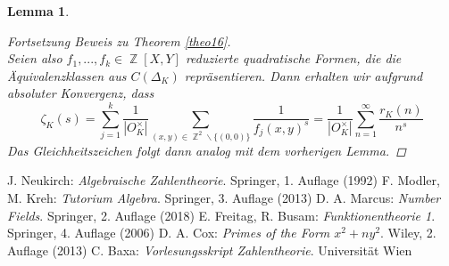 \documentclass[10pt,a4paper]{article}
\theoremstyle{plain}
\newtheorem{lem}[thm]{Lemma}
\theoremstyle{definition}
\theoremstyle{remark}
\DeclareMathOperator{\Z}{\mathbb{Z}}
\begin{document}
\begin{lem}
\begin{proof}[Fortsetzung Beweis zu Theorem \ref{theo16}]
\\
Seien also $f_1,...,f_k \in \Z[X,Y]$ reduzierte quadratische Formen, die die Äquivalenzklassen aus $C(\Delta_K)$ repräsentieren. Dann erhalten wir aufgrund absoluter Konvergenz, dass $$\zeta_K(s) = \sum_{j=1}^{k}\frac{1}{|O_K^{\times}|}\sum_{(x,y) \in \Z^2 \backslash \{(0,0)\}}\frac{1}{f_j(x,y)^s}=\frac{1}{|O_K^{\times}|}\sum_{n=1}^{\infty}\frac{r_K(n)}{n^s}$$
Das Gleichheitszeichen folgt dann analog mit dem vorherigen Lemma.
\end{proof}
\end{lem}
 
\begin{thebibliography}{99}
 J. Neukirch: \textit{Algebraische Zahlentheorie}. Springer, 1. Auflage (1992)
 F. Modler, M. Kreh: \textit{Tutorium Algebra}. Springer, 3. Auflage (2013)
 D. A. Marcus: \textit{Number Fields}. Springer, 2. Auflage (2018)
 E. Freitag, R. Busam: \textit{Funktionentheorie 1}. Springer, 4. Auflage (2006)
 D. A. Cox: \textit{Primes of the Form ${x}^2 + n{y}^2$}. Wiley, 2. Auflage (2013)
 C. Baxa: \textit{Vorlesungsskript Zahlentheorie}. Universität Wien
\end{thebibliography}
\end{document}
